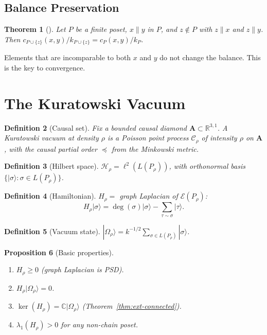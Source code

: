 \documentclass[11pt]{article}
\newtheorem{theorem}{Theorem}[section]
\newtheorem{proposition}[theorem]{Proposition}
\newtheorem{definition}[theorem]{Definition}
\newcommand{\hilb}{\mathscr{H}}
\begin{document}
\subsection{Balance Preservation}

\begin{theorem}[{\cite[Clustering.lean]{SilvaAlvarado26}}]
\label{thm:bp}
Let $P$ be a finite poset, $x \parallel y$ in $P$, and
$z \notin P$ with $z \parallel x$ and $z \parallel y$.
Then $c_{P \cup \{z\}}(x,y)/k_{P \cup \{z\}} = c_P(x,y)/k_P$.
\end{theorem}

Elements that are incomparable to both $x$ and $y$ do not
change the balance.  This is the key to convergence.

\section{The Kuratowski Vacuum}
\label{sec:vacuum}

\begin{definition}[Causal set]
Fix a bounded causal diamond
$\mathbf{A} \subset \mathbb{R}^{3,1}$.  A \emph{Kuratowski
vacuum at density $\rho$} is a Poisson point process
$\mathcal{C}_\rho$ of intensity $\rho$ on $\mathbf{A}$,
with the causal partial order $\preceq$ from the Minkowski
metric.
\end{definition}

\begin{definition}[Hilbert space]
\label{def:hilbert}
$\hilb_\rho = \ell^2(L(P_\rho))$, with orthonormal basis
$\{|\sigma\rangle : \sigma \in L(P_\rho)\}$.
\end{definition}

\begin{definition}[Hamiltonian]
\label{def:hamiltonian}
$H_\rho = $ graph Laplacian of $\mathcal{E}(P_\rho)$:
\[
  H_\rho |\sigma\rangle = \deg(\sigma)|\sigma\rangle
  - \sum_{\tau \sim \sigma} |\tau\rangle.
\]
\end{definition}

\begin{definition}[Vacuum state]
\label{def:vacuum-state}
$|\Omega_\rho\rangle = k^{-1/2}
\sum_{\sigma \in L(P_\rho)} |\sigma\rangle$.
\end{definition}

\begin{proposition}[Basic properties]
\label{prop:basic}
\begin{enumerate}
\item[(a)] $H_\rho \ge 0$ (graph Laplacian is PSD).
\item[(b)] $H_\rho |\Omega_\rho\rangle = 0$.
\item[(c)] $\ker(H_\rho) = \mathbb{C}|\Omega_\rho\rangle$
  (Theorem~\ref{thm:ext-connected}).
\item[(d)] $\lambda_1(H_\rho) > 0$ for any non-chain poset.
\end{enumerate}
\end{proposition}
\end{document}
